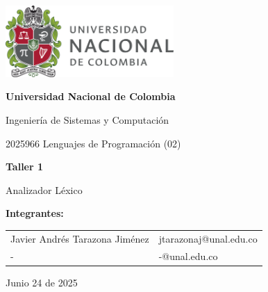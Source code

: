 \documentclass{article}
\begin{document}
\begin{titlepage}
  \centering
  \includegraphics[width=0.48\textwidth]{logo_universidad.png}
  \par\vspace{2cm}

  {\Large \textbf{Universidad Nacional de Colombia} \par}
  \vspace{0.5cm}
  {\large Ingeniería de Sistemas y Computación \par}
  {\large 2025966 Lenguajes de Programación (02)\par}
  \vspace{3cm}

  {\large \textbf{Taller 1} \par}
  {\large Analizador Léxico\par}
  \vspace{3cm}

  {\large \textbf{Integrantes:} \par}
  \vspace{0.5cm}
  \begin{tabular}{ll}
    Javier Andrés Tarazona Jiménez & jtarazonaj@unal.edu.co \\
    -                              & -@unal.edu.co          \\
  \end{tabular}
  \par\vspace{3cm}

  {\large Junio 24 de 2025 \par}
\end{titlepage}

\tableofcontents %

\newpage %


\end{document}
